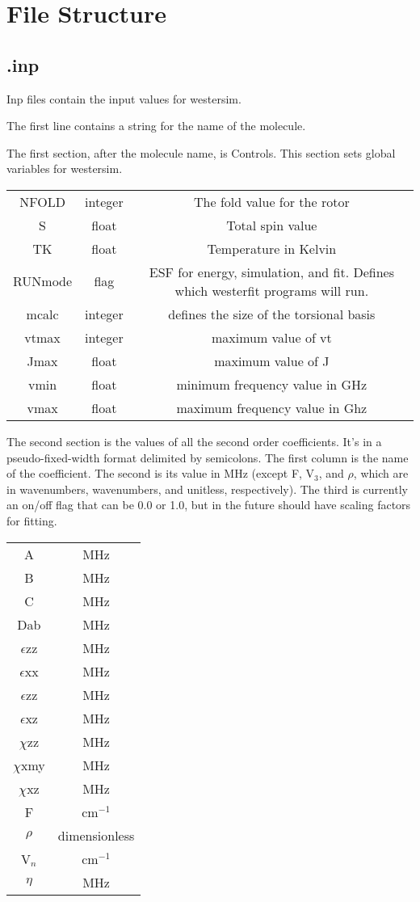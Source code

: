 \documentclass{article}
\begin{document}
	
\section{File Structure}

\subsection{.inp}

Inp files contain the input values for westersim.

The first line contains a string for the name of the molecule.

The first section, after the molecule name, is Controls. This section sets global variables for westersim.

\begin{tabular}{c c c}
	NFOLD & integer & The fold value for the rotor \\
	S & float & Total spin value \\
	TK & float & Temperature in Kelvin \\
	RUNmode & flag & ESF for energy, simulation, and fit. Defines which westerfit programs will run. \\
	mcalc & integer & defines the size of the torsional basis \\
	vtmax & integer & maximum value of vt \\
	Jmax & float & maximum value of J \\
	vmin & float & minimum frequency value in GHz \\
	vmax & float & maximum frequency value in Ghz \\
\end{tabular}

The second section is the values of all the second order coefficients. It's in a pseudo-fixed-width format delimited by semicolons. The first column is the name of the coefficient. The second is its value in MHz (except F, V$_3$, and $\rho$, which are in wavenumbers, wavenumbers, and unitless, respectively). The third is currently an on/off flag that can be 0.0 or 1.0, but in the future should have scaling factors for fitting.

\begin{tabular}{c c}
	A & MHz \\
	B & MHz \\
	C & MHz \\
	Dab & MHz \\
	$\epsilon$zz & MHz \\
	$\epsilon$xx & MHz \\
	$\epsilon$zz & MHz \\
	$\epsilon$xz & MHz \\
	$\chi$zz & MHz \\
	$\chi$xmy & MHz \\
	$\chi$xz & MHz \\
	F & cm$^{-1}$ \\
	$\rho$ & dimensionless \\
	V$_n$ & cm$^{-1}$ \\
	$\eta$ & MHz \\
\end{tabular}
\end{document}

